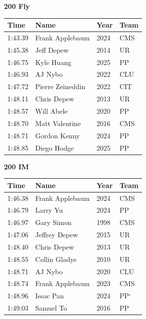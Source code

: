 \vspace{1.2em}
\noindent\begin{minipage}[t]{0.98\textwidth}
\centering
\textbf{\textcolor{teamprimary}{200 Fly}}\par
\vspace{0.5em}
\centering
\small
\renewcommand{\arraystretch}{1.0}
\setlength{\tabcolsep}{4pt}
\begin{tabular}{@{}p{2.5cm}p{4.5cm}p{1.5cm}p{2.5cm}@{}}
\toprule
\textbf{Time} & \textbf{Name} & \textbf{Year} & \textbf{Team} \\
\midrule
1:43.39 & Frank Applebaum & 2024 & CMS \\
1:45.38 & Jeff Depew & 2014 & UR \\
1:46.75 & Kyle Huang & 2025 & PP \\
1:46.93 & AJ Nybo & 2022 & CLU \\
1:47.72 & Pierre Zeineddin & 2022 & CIT \\
1:48.11 & Chris Depew & 2013 & UR \\
1:48.57 & Will Abele & 2020 & PP \\
1:48.70 & Matt Valentine & 2016 & CMS \\
1:48.71 & Gordon Kenny & 2024 & PP \\
1:48.85 & Diego Hodge & 2025 & PP \\
\bottomrule
\end{tabular}
\end{minipage}
\vspace{1.2em}
\noindent\begin{minipage}[t]{0.98\textwidth}
\centering
\textbf{\textcolor{teamprimary}{200 IM}}\par
\vspace{0.5em}
\centering
\small
\renewcommand{\arraystretch}{1.0}
\setlength{\tabcolsep}{4pt}
\begin{tabular}{@{}p{2.5cm}p{4.5cm}p{1.5cm}p{2.5cm}@{}}
\toprule
\textbf{Time} & \textbf{Name} & \textbf{Year} & \textbf{Team} \\
\midrule
1:46.38 & Frank Applebaum & 2024 & CMS \\
1:46.79 & Larry Yu & 2024 & PP \\
1:46.97 & Gary Simon & 1998 & CMS \\
1:47.06 & Jeffrey Depew & 2015 & UR \\
1:48.40 & Chris Depew & 2013 & UR \\
1:48.55 & Collin Gladys & 2010 & UR \\
1:48.71 & AJ Nybo & 2020 & CLU \\
1:48.74 & Frank Applebaum & 2023 & CMS \\
1:48.96 & Issac Pan & 2024 & PP` \\
1:49.03 & Samuel To & 2016 & PP \\
\bottomrule
\end{tabular}
\end{minipage}
